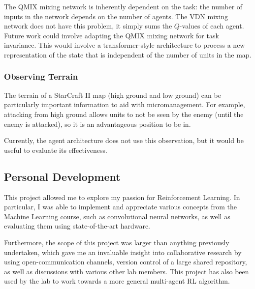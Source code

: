 The QMIX mixing network is inherently dependent on the task: the number of inputs in the network depends on the number of agents. The VDN mixing network does not have this problem, it simply sums the $Q$-values of each agent. Future work could involve adapting the QMIX mixing network for task invariance. This would involve a transformer-style architecture to process a new representation of the state that is independent of the number of units in the map.


\subsubsection{Observing Terrain}

The terrain of a StarCraft II map (high ground and low ground) can be particularly important information to aid with micromanagement. For example, attacking from high ground allows units to not be seen by the enemy (until the enemy is attacked), so it is an advantageous position to be in.

Currently, the agent architecture does not use this observation, but it would be useful to evaluate its effectiveness.


\subsection{Personal Development}
This project allowed me to explore my passion for Reinforcement Learning. In particular, I was able to implement and appreciate various concepts from the Machine Learning course, such as convolutional neural networks, as well as evaluating them using state-of-the-art hardware.

Furthermore, the scope of this project was larger than anything previously undertaken, which gave me an invaluable insight into collaborative research by using open-communication channels, version control of a large shared repository, as well as discussions with various other lab members. This project has also been used by the lab to work towards a more general multi-agent RL algorithm.